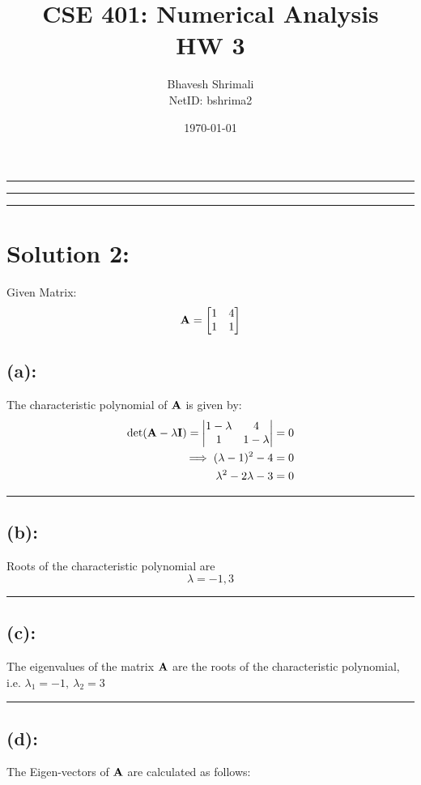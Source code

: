 
\title{\bf CSE 401: Numerical Analysis \\ HW 3}
\author{Bhavesh Shrimali \\ NetID: bshrima2}
\date{\today}
\titlespacing*{\title}{-2ex}{*-2ex}{-2ex}

\maketitle \hrule \hrule \hrule
\section*{Solution 2:}
Given Matrix: 
\[
{\bf A} = 
\begin{bmatrix}
1 & 4 \\
1 & 1 
\end{bmatrix}
\]
\subsection*{(a):}The characteristic polynomial of ${\bf A}$ is given by: 
\begin{align*}
\det ({\bf A} - \lambda {\bf I}) = 
\begin{vmatrix}
1-\lambda & 4 \\
1 & 1-\lambda
\end{vmatrix} = 0 \\
\implies (\lambda - 1)^2 - 4 = 0\\
\lambda^2 - 2\lambda - 3 = 0
\end{align*}\hrule
\subsection*{(b):}
Roots of the characteristic polynomial are
\[
\lambda = -1 ,3 
\]\hrule
\subsection*{(c):}
The eigenvalues of the matrix ${\bf A}$ are the roots of the characteristic polynomial, i.e. $\lambda_1 = -1,\ \lambda_2 = 3$ \\ \hrule
\subsection*{(d):}
The Eigen-vectors of $\bf A$ are calculated as follows:
